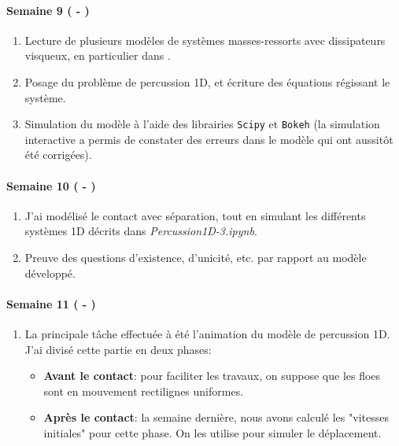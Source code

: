 \paragraph{Semaine 9 ( - )} 
\begin{enumerate}
    \item Lecture de plusieurs modèles de systèmes masses-ressorts avec dissipateurs visqueux, en particulier dans \parencite{homodeling}.
    \item Posage du problème de percussion 1D, et écriture des équations régissant le système.
    \item Simulation du modèle à l'aide des librairies \verb|Scipy| et \verb|Bokeh| (la simulation interactive a permis de constater des erreurs dans le modèle qui ont aussitôt été corrigées). 
\end{enumerate}
  

\paragraph{Semaine 10 ( - )} 
\begin{enumerate}
    \item J'ai modélisé le contact avec séparation, tout en simulant les différents systèmes 1D décrits dans \emph{Percussion1D-3.ipynb}. 
    \item Preuve des questions d'existence, d'unicité, etc. par rapport au modèle développé.
\end{enumerate}


\paragraph{Semaine 11 ( - )} 
\begin{enumerate}
    \item La principale tâche effectuée à été l'animation du modèle de percussion 1D. J'ai divisé cette partie en deux phases:
    \begin{itemize}
        \item \textbf{Avant le contact}: pour faciliter les travaux, on suppose que les floes sont en mouvement rectilignes uniformes.
        \item \textbf{Après le contact}: la semaine dernière, nous avons calculé les "vitesses initiales" pour cette phase. On les utilise pour simuler le déplacement.
    \end{itemize}
\end{enumerate}


